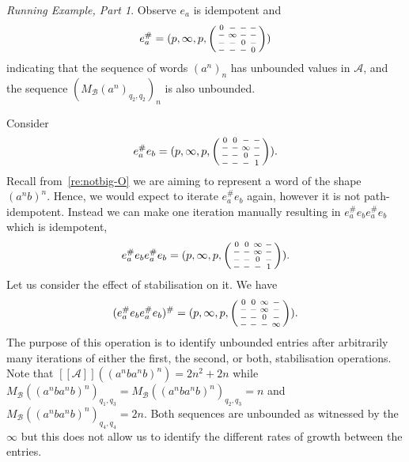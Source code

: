 \documentclass{lmcs}
\theoremstyle{remark}
\newcommand{\autA}{\mathcal{A}}
\newcommand{\autB}{\mathcal{B}}
\newcommand{\brfunc}[1]{[\![#1]\!]}
\newcommand{\funcA}{\brfunc{\autA}}
\newcommand{\nopath}{-}
\newenvironment{smallpmatrix}
  {\left(\begin{smallmatrix}}
  {\end{smallmatrix}\right)}
\theoremstyle{remark}
\newtheorem{runningexample/}{Running Example, Part}
\newenvironment{runningexample}
  {\renewcommand{\qedsymbol}{\color{darkgray}\ensuremath{\lrcorner}}%
   \pushQED{\qed}\begin{runningexample/}}
  {\popQED\end{runningexample/}}
\begin{document}
\begin{runningexample}
Observe $e_a$ is idempotent and \[e_a^\#= (p,\infty,p,
\begin{smallpmatrix}
0 & \nopath & \nopath & \nopath\\
\nopath & \infty & \nopath & \nopath\\
\nopath & \nopath & 0 & \nopath\\
\nopath & \nopath & \nopath & 0
\end{smallpmatrix})\] indicating that the sequence of words $(a^n)_n$ has unbounded values in $\autA$, and the sequence $\left(M_{\autB}(a^n)_{q_2,q_2}\right)_n$ is also unbounded.

Consider \[e_a^\#e_b= (p,\infty,p,
\begin{smallpmatrix}
0 & 0 & \nopath & \nopath\\
\nopath & \nopath & \infty & \nopath\\
\nopath & \nopath & 0 & \nopath\\
\nopath & \nopath & \nopath & 1
\end{smallpmatrix}).\]
Recall from~\cref{re:notbig-O} we are aiming to represent a word of the shape $(a^nb)^n$. Hence, we would expect to iterate $e_a^\#e_b$ again, however it is not path-idempotent. Instead we can make one iteration manually resulting in $e_a^\#e_be_a^\#e_b$ which is idempotent,
\[e_a^\#e_be_a^\#e_b= (p,\infty,p,
\begin{smallpmatrix}
0 & 0 & \infty & \nopath\\
\nopath & \nopath & \infty & \nopath\\
\nopath & \nopath & 0 & \nopath\\
\nopath & \nopath & \nopath & 1
\end{smallpmatrix}).\]
Let us consider the effect of stabilisation on it. We have \[(e_a^\#e_be_a^\#e_b)^\#= (p,\infty,p,
\begin{smallpmatrix}
0 & 0 & \infty & \nopath \\
\nopath & \nopath & \infty & \nopath\\
\nopath & \nopath & 0 & \nopath\\
\nopath & \nopath & \nopath & \infty
\end{smallpmatrix}).\] 
The purpose of this operation is to identify unbounded entries after arbitrarily many iterations of either the first, the second, or both, stabilisation operations. Note that $\funcA((a^{n}ba^{n}b)^n) = 2n^2+2n$ while $M_{\autB}((a^{n}ba^{n}b)^n)_{q_1,q_3} =M_{\autB}((a^{n}ba^{n}b)^n)_{q_2,q_3}  =n$ and $M_{\autB}((a^{n}ba^{n}b)^n)_{q_4,q_4}= 2n$. Both sequences are unbounded as witnessed by the $\infty$ but this does not allow us to identify the different rates of growth between the entries. 
\end{runningexample}
\end{document}
